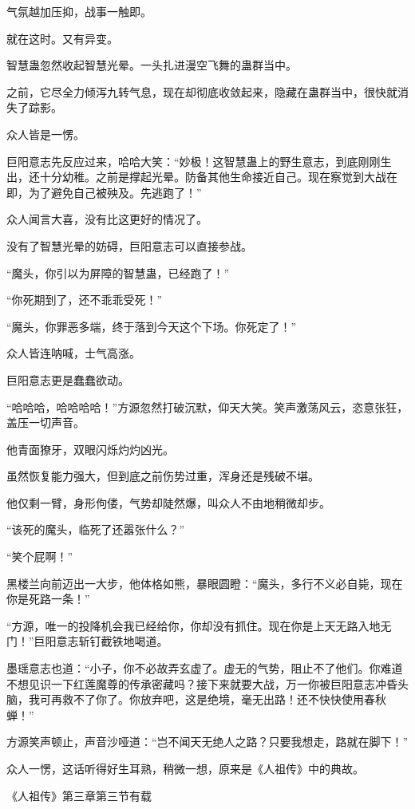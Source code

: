 \begin{this_body}
气氛越加压抑，战事一触即。

就在这时。又有异变。

智慧蛊忽然收起智慧光晕。一头扎进漫空飞舞的蛊群当中。

之前，它尽全力倾泻九转气息，现在却彻底收敛起来，隐藏在蛊群当中，很快就消失了踪影。

众人皆是一愣。

巨阳意志先反应过来，哈哈大笑：“妙极！这智慧蛊上的野生意志，到底刚刚生出，还十分幼稚。之前是撑起光晕。防备其他生命接近自己。现在察觉到大战在即，为了避免自己被殃及。先逃跑了！”

众人闻言大喜，没有比这更好的情况了。

没有了智慧光晕的妨碍，巨阳意志可以直接参战。

“魔头，你引以为屏障的智慧蛊，已经跑了！”

“你死期到了，还不乖乖受死！”

“魔头，你罪恶多端，终于落到今天这个下场。你死定了！”

众人皆连呐喊，士气高涨。

巨阳意志更是蠢蠢欲动。

“哈哈哈，哈哈哈哈！”方源忽然打破沉默，仰天大笑。笑声激荡风云，恣意张狂，盖压一切声音。

他青面獠牙，双眼闪烁灼灼凶光。

虽然恢复能力强大，但到底之前伤势过重，浑身还是残破不堪。

他仅剩一臂，身形佝偻，气势却陡然爆，叫众人不由地稍微却步。

“该死的魔头，临死了还嚣张什么？”

“笑个屁啊！”

黑楼兰向前迈出一大步，他体格如熊，暴眼圆瞪：“魔头，多行不义必自毙，现在你是死路一条！”

“方源，唯一的投降机会我已经给你，你却没有抓住。现在你是上天无路入地无门！”巨阳意志斩钉截铁地喝道。

墨瑶意志也道：“小子，你不必故弄玄虚了。虚无的气势，阻止不了他们。你难道不想见识一下红莲魔尊的传承密藏吗？接下来就要大战，万一你被巨阳意志冲昏头脑，我可再救不了你了。你放弃吧，这是绝境，毫无出路！还不快快使用春秋蝉！”

方源笑声顿止，声音沙哑道：“岂不闻天无绝人之路？只要我想走，路就在脚下！”

众人一愣，这话听得好生耳熟，稍微一想，原来是《人祖传》中的典故。

《人祖传》第三章第三节有载


\end{this_body}
